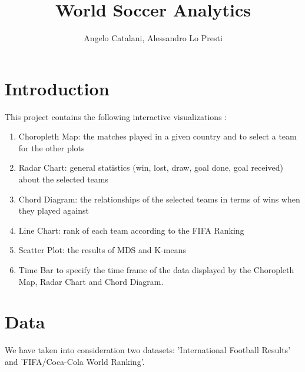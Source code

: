 \documentclass[journal]{vgtc}                %
\title{World Soccer Analytics}
\author{Angelo Catalani, Alessandro Lo Presti}
\begin{document}

\maketitle
\section{Introduction}
This project contains the following interactive visualizations :
\begin{enumerate}
\item Choropleth Map: the matches played in a given country and to select a team for the other plots
\item Radar Chart: general statistics (win, lost, draw, goal done, goal received) about the selected teams
\item Chord Diagram: the relationships of the selected teams in terms of wins when they played against
\item Line Chart: rank of each team according to the FIFA Ranking
\item Scatter Plot: the results of MDS and K-means
\item Time Bar to specify the time frame of the data displayed by the Choropleth Map, Radar Chart and Chord Diagram.
\end{enumerate}



\section{Data}
We have taken into consideration two datasets: 'International Football Results' and 'FIFA/Coca-Cola World Ranking'.
\end{document}
